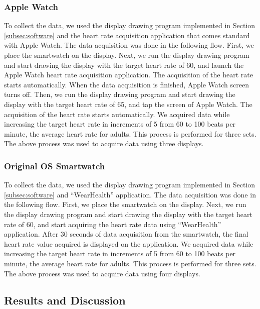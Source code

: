 \documentclass[sigchi,authordraft]{acmart}
\begin{document}
\subsubsection{Apple Watch}
To collect the data, we used the display drawing program implemented in Section \ref{subsec:software} and the heart rate acquisition application that comes standard with Apple Watch. The data acquisition was done in the following flow. First, we place the smartwatch on the display. Next, we run the display drawing program and start drawing the display with the target heart rate of 60, and launch the Apple Watch heart rate acquisition application. The acquisition of the heart rate starts automatically. When the data acquisition is finished, Apple Watch screen turns off. Then, we run the display drawing program and start drawing the display with the target heart rate of 65, and tap the screen of Apple Watch. The acquisition of the heart rate starts automatically. We acquired data while increasing the target heart rate in increments of 5 from 60 to 100 beats per minute, the average heart rate for adults\cite{average_heart_rate}. This process is performed for three sets. The above process was used to acquire data using three displays.


\subsubsection{Original OS Smartwatch}
\label{subsubsec:original_collect}
To collect the data, we used the display drawing program implemented in Section \ref{subsec:software} and ``WearHealth'' application. The data acquisition was done in the following flow. First, we place the smartwatch on the display. Next, we run the display drawing program and start drawing the display with the target heart rate of 60, and start acquiring the heart rate data using ``WearHealth'' application. After 30 seconds of data acquisition from the smartwatch, the final heart rate value acquired is displayed on the application. We acquired data while increasing the target heart rate in increments of 5 from 60 to 100 beats per minute, the average heart rate for adults\cite{average_heart_rate}. This process is performed for three sets. The above process was used to acquire data using four displays.


\subsection{Results and Discussion}
\end{document}
